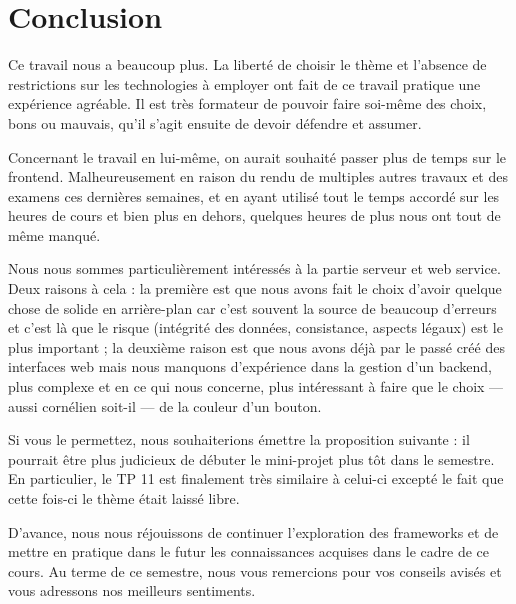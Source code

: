 
\section*{Conclusion}
Ce travail nous a beaucoup plus. La liberté de choisir le thème et l'absence de restrictions sur les technologies 
à employer
ont fait de ce travail pratique une expérience agréable. Il est très formateur de pouvoir faire soi-même des choix, 
bons ou mauvais, qu'il s'agit ensuite de devoir défendre et assumer.

Concernant le travail en lui-même, on aurait souhaité passer plus de temps sur le frontend. Malheureusement 
en raison du rendu de multiples autres travaux et des examens ces dernières semaines, et en ayant utilisé tout 
le temps accordé sur les heures de cours et bien plus en dehors, quelques heures de plus nous ont tout de même manqué.

Nous nous sommes particulièrement intéressés à la partie serveur et web service. 
Deux raisons à cela : la première est que nous avons fait le choix d'avoir quelque chose de solide en arrière-plan car c'est souvent la source de beaucoup d'erreurs et
c'est là que le risque (intégrité des données, consistance, aspects légaux) est le plus important ;
la deuxième raison est que nous avons déjà par le passé créé des interfaces web mais nous manquons
d'expérience dans la gestion d'un backend, plus complexe et en ce qui nous concerne, plus intéressant à faire
que le choix --- aussi cornélien soit-il --- de la couleur d'un bouton.

Si vous le permettez, nous souhaiterions émettre la proposition suivante : il pourrait être plus judicieux de débuter le mini-projet
plus tôt dans le semestre. En particulier, le TP 11 est finalement très similaire à celui-ci excepté le fait que cette
fois-ci le thème était laissé libre.

D'avance, nous nous réjouissons de continuer l'exploration des frameworks et de mettre en pratique 
dans le futur 
les connaissances acquises dans le cadre de ce cours. Au terme de ce semestre, nous vous 
remercions pour vos conseils avisés et vous adressons nos meilleurs sentiments.
